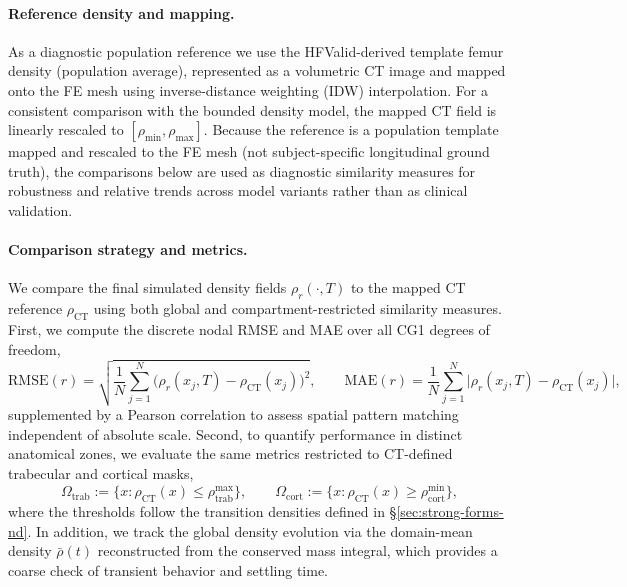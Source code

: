 \paragraph{Reference density and mapping.}
As a diagnostic population reference we use the HFValid-derived template femur density (population average), represented as a volumetric CT image and mapped onto the FE mesh using inverse-distance weighting (IDW) interpolation.
For a consistent comparison with the bounded density model, the mapped CT field is linearly rescaled to $[\rho_{\min},\rho_{\max}]$.
Because the reference is a population template mapped and rescaled to the FE mesh (not subject-specific longitudinal ground truth), the comparisons below are used as diagnostic similarity measures for robustness and relative trends across model variants rather than as clinical validation.

\paragraph{Comparison strategy and metrics.}
We compare the final simulated density fields $\rho_r(\cdot,T)$ to the mapped CT reference $\rho_{\mathrm{CT}}$ using both global and compartment-restricted similarity measures.
First, we compute the discrete nodal RMSE and MAE over all CG1 degrees of freedom,
\[
\mathrm{RMSE}(r)=\sqrt{\frac{1}{N}\sum_{j=1}^N\big(\rho_r(x_j,T)-\rho_{\mathrm{CT}}(x_j)\big)^2},\qquad
\mathrm{MAE}(r)=\frac{1}{N}\sum_{j=1}^N\big|\rho_r(x_j,T)-\rho_{\mathrm{CT}}(x_j)\big|,
\]
supplemented by a Pearson correlation to assess spatial pattern matching independent of absolute scale.
Second, to quantify performance in distinct anatomical zones, we evaluate the same metrics restricted to CT-defined trabecular and cortical masks,
\[
\Omega_{\mathrm{trab}}:=\{x:\rho_{\mathrm{CT}}(x)\le \rho_{\mathrm{trab}}^{\max}\},\qquad
\Omega_{\mathrm{cort}}:=\{x:\rho_{\mathrm{CT}}(x)\ge \rho_{\mathrm{cort}}^{\min}\},
\]
where the thresholds follow the transition densities defined in \S\ref{sec:strong-forms-nd}.
In addition, we track the global density evolution via the domain-mean density $\bar\rho(t)$ reconstructed from the conserved mass integral, which provides a coarse check of transient behavior and settling time.

